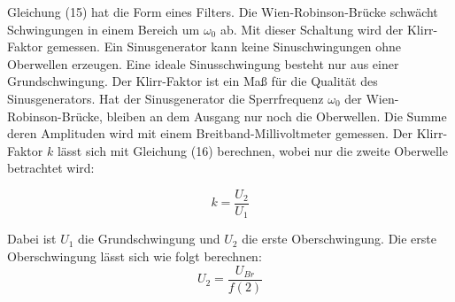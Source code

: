 Gleichung (15) hat die Form eines Filters. Die Wien-Robinson-Brücke schwächt Schwingungen in einem
Bereich um $\omega_0$ ab. Mit dieser Schaltung wird der Klirr-Faktor gemessen. Ein Sinusgenerator kann keine
Sinuschwingungen ohne Oberwellen erzeugen. Eine ideale Sinusschwingung besteht nur aus einer Grundschwingung.
Der Klirr-Faktor ist ein Maß für die Qualität des Sinusgenerators. Hat der Sinusgenerator die Sperrfrequenz $\omega_0$
der Wien-Robinson-Brücke, bleiben an dem Ausgang nur noch die Oberwellen. Die Summe deren Amplituden wird mit einem
Breitband-Millivoltmeter gemessen. Der Klirr-Faktor $k$ lässt sich mit Gleichung (16) berechnen, wobei nur die zweite
Oberwelle betrachtet wird:

\begin{equation}
  k = \frac{{U_2}}{U_1}
\end{equation}

Dabei ist $U_1$ die Grundschwingung und $U_2$ die erste Oberschwingung. Die erste Oberschwingung lässt sich wie folgt
berechnen:
\begin{equation}
  U_2 = \frac{U_{Br}}{f(2)}
\end{equation}


